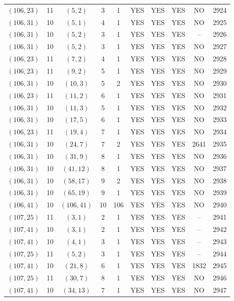 \begin{longtable}{|c|c|c|c|c|c|c|c|c|c|}
$(106, 23)$ & 11 & $(5, 2)$ & 3 & 1 & YES & YES & YES & NO & 2924\\
$(106, 31)$ & 10 & $(5, 1)$ & 4 & 1 & YES & YES & YES & NO & 2925\\
$(106, 31)$ & 10 & $(5, 2)$ & 3 & 1 & YES & YES & YES & -- & 2926\\
$(106, 31)$ & 10 & $(5, 2)$ & 3 & 1 & YES & YES & YES & NO & 2927\\
$(106, 23)$ & 11 & $(7, 2)$ & 4 & 1 & YES & YES & YES & NO & 2928\\
$(106, 23)$ & 11 & $(9, 2)$ & 5 & 1 & YES & YES & YES & NO & 2929\\
$(106, 31)$ & 10 & $(10, 3)$ & 5 & 2 & YES & YES & YES & NO & 2930\\
$(106, 23)$ & 11 & $(11, 2)$ & 6 & 1 & YES & YES & YES & NO & 2931\\
$(106, 31)$ & 10 & $(11, 3)$ & 5 & 1 & YES & YES & YES & NO & 2932\\
$(106, 31)$ & 10 & $(17, 5)$ & 6 & 1 & YES & YES & YES & NO & 2933\\
$(106, 23)$ & 11 & $(19, 4)$ & 7 & 1 & YES & YES & YES & NO & 2934\\
$(106, 31)$ & 10 & $(24, 7)$ & 7 & 2 & YES & YES & YES & 2641 & 2935\\
$(106, 31)$ & 10 & $(31, 9)$ & 8 & 1 & YES & YES & YES & NO & 2936\\
$(106, 31)$ & 10 & $(41, 12)$ & 8 & 1 & YES & YES & YES & NO & 2937\\
$(106, 31)$ & 10 & $(58, 17)$ & 9 & 2 & YES & YES & YES & NO & 2938\\
$(106, 31)$ & 10 & $(65, 19)$ & 9 & 1 & YES & YES & YES & NO & 2939\\
$(106, 41)$ & 10 & $(106, 41)$ & 10 & 106 & YES & YES & YES & NO & 2940\\
$(107, 25)$ & 11 & $(3, 1)$ & 2 & 1 & YES & YES & YES & -- & 2941\\
$(107, 41)$ & 10 & $(3, 1)$ & 2 & 1 & YES & YES & YES & -- & 2942\\
$(107, 41)$ & 10 & $(4, 1)$ & 3 & 1 & YES & YES & YES & -- & 2943\\
$(107, 25)$ & 11 & $(5, 2)$ & 3 & 1 & YES & YES & YES & -- & 2944\\
$(107, 41)$ & 10 & $(21, 8)$ & 6 & 1 & YES & YES & YES & 1832 & 2945\\
$(107, 25)$ & 11 & $(30, 7)$ & 8 & 1 & YES & YES & YES & NO & 2946\\
$(107, 41)$ & 10 & $(34, 13)$ & 7 & 1 & YES & YES & YES & NO & 2947\\

\end{longtable}
